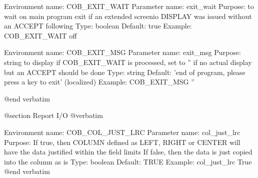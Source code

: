 Environment name:  COB_EXIT_WAIT
  Parameter name:  exit_wait
         Purpose:  to wait on main program exit if an extended screenio
                   DISPLAY was issued without an ACCEPT following
            Type:  boolean
         Default:  true
         Example:  COB_EXIT_WAIT off

Environment name:  COB_EXIT_MSG
  Parameter name:  exit_msg
         Purpose:  string to display if COB_EXIT_WAIT is processed, set to ''
                   if no actual display but an ACCEPT should be done
            Type:  string
         Default:  'end of program, please press a key to exit' (localized)
         Example:  COB_EXIT_MSG ''


@end verbatim

@section Report I/O
@verbatim


Environment name:  COB_COL_JUST_LRC
  Parameter name:  col_just_lrc
         Purpose:  If true, then COLUMN defined as LEFT, RIGHT or CENTER
                   will have the data justified within the field limits
                   If false, then the data is just copied into the column as is
            Type:  boolean
         Default:  TRUE
         Example:  col_just_lrc True
@end verbatim
